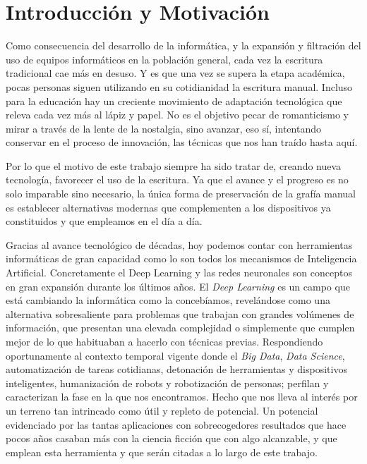 \chapter{Introducción y Motivación}
Como consecuencia del desarrollo de la informática, y la expansión y
filtración del uso de equipos informáticos en la población general,
cada vez la escritura tradicional cae más en desuso. Y es que una
vez se supera la etapa académica, pocas personas siguen utilizando
en su cotidianidad la escritura manual. Incluso para la educación
hay un creciente movimiento de adaptación tecnológica que releva
cada vez más al lápiz y papel.\newline
No es el objetivo pecar de romanticismo y mirar a través de la lente
de la nostalgia, sino avanzar, eso sí, intentando conservar en el proceso
de innovación, las técnicas que nos han traído hasta aquí.

Por lo que el motivo de este trabajo siempre ha sido tratar de,
creando nueva tecnología, favorecer el uso de la escritura.
Ya que el avance y el progreso es no solo imparable sino necesario,
la única forma de preservación de la grafía manual es establecer
alternativas modernas que complementen a los dispositivos ya
constituidos y que empleamos en el día a día.

Gracias al avance tecnológico de décadas, hoy podemos contar con
herramientas informáticas de gran capacidad como lo son todos
los mecanismos de Inteligencia Artificial. Concretamente el Deep
Learning y las redes neuronales son conceptos en gran expansión
durante los últimos años.
El \textit{Deep Learning} es un campo que está cambiando
la informática como la concebíamos, revelándose como una alternativa
sobresaliente para problemas que trabajan con grandes volúmenes de
información, que presentan una elevada complejidad o simplemente
que cumplen mejor de lo que habituaban a hacerlo con técnicas
previas. Respondiendo oportunamente al contexto temporal vigente
donde el \textit{Big Data}, \textit{Data Science}, automatización
de tareas cotidianas, detonación de herramientas y dispositivos
inteligentes, humanización de robots y robotización de personas;
perfilan y caracterizan la fase en la que nos encontramos.
Hecho que nos lleva al interés por un terreno tan intrincado
como útil y repleto de potencial. Un potencial evidenciado por
las tantas aplicaciones con sobrecogedores resultados que hace pocos
años casaban más con la ciencia ficción que con algo alcanzable, y que
emplean esta herramienta y que serán citadas a lo largo de este trabajo.



